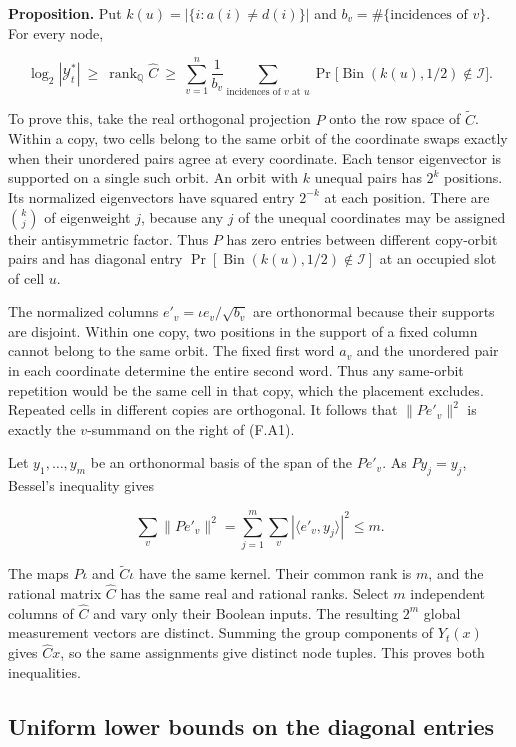 \documentclass[
  11pt,
]{article}
\begin{document}
\textbf{Proposition.} Put \(k(u)=|\{i:a(i)\ne d(i)\}|\) and
\(b_v=\#\{\text{incidences of }v\}\). For every node,

\[
 \log_2|\mathcal Y_t^*|\ \ge\ \operatorname{rank}_{\mathbb Q}\widehat C
 \ \ge\
 \sum_{v=1}^n\frac{1}{b_v}
 \sum_{\text{incidences of }v\text{ at }u}
 \Pr\bigl[\operatorname{Bin}(k(u),1/2)\notin\mathcal I\bigr].
 \tag{F.A1}
\]

To prove this, take the real orthogonal projection \(P\) onto the row
space of \(\widetilde C\). Within a copy, two cells belong to the same
orbit of the coordinate swaps exactly when their unordered pairs agree
at every coordinate. Each tensor eigenvector is supported on a single
such orbit. An orbit with \(k\) unequal pairs has \(2^k\) positions. Its
normalized eigenvectors have squared entry \(2^{-k}\) at each position.
There are \(\binom{k}{j}\) of eigenweight \(j\), because any \(j\) of
the unequal coordinates may be assigned their antisymmetric factor. Thus
\(P\) has zero entries between different copy-orbit pairs and has
diagonal entry \(\Pr[\operatorname{Bin}(k(u),1/2)\notin\mathcal I]\) at
an occupied slot of cell \(u\).

The normalized columns \(e'_v=\iota e_v/\sqrt{b_v}\) are orthonormal
because their supports are disjoint. Within one copy, two positions in
the support of a fixed column cannot belong to the same orbit. The fixed
first word \(a_v\) and the unordered pair in each coordinate determine
the entire second word. Thus any same-orbit repetition would be the same
cell in that copy, which the placement excludes. Repeated cells in
different copies are orthogonal. It follows that \(\|Pe'_v\|^2\) is
exactly the \(v\)-summand on the right of (F.A1).

Let \(y_1,\ldots,y_m\) be an orthonormal basis of the span of the
\(Pe'_v\). As \(Py_j=y_j\), Bessel's inequality gives

\[
  \sum_v\|Pe'_v\|^2=\sum_{j=1}^m\sum_v|\langle e'_v,y_j\rangle|^2\le m.
\]

The maps \(P\iota\) and \(\widetilde C\iota\) have the same kernel.
Their common rank is \(m\), and the rational matrix \(\widehat C\) has
the same real and rational ranks. Select \(m\) independent columns of
\(\widehat C\) and vary only their Boolean inputs. The resulting \(2^m\)
global measurement vectors are distinct. Summing the group components of
\(Y_t(x)\) gives \(\widehat Cx\), so the same assignments give distinct
node tuples. This proves both inequalities.

\subsection{Uniform lower bounds on the diagonal
entries}\label{uniform-lower-bounds-on-the-diagonal-entries}
\end{document}
